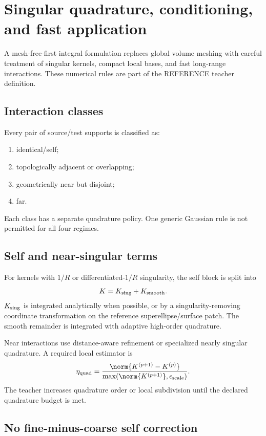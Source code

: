 \section{Singular quadrature, conditioning, and fast application}
\label{sec:em-numerics}

A mesh-free-first integral formulation replaces global volume meshing with
careful treatment of singular kernels, compact local bases, and fast
long-range interactions. These numerical rules are part of the REFERENCE
teacher definition.

\subsection{Interaction classes}

Every pair of source/test supports is classified as:
\begin{enumerate}
\item identical/self;
\item topologically adjacent or overlapping;
\item geometrically near but disjoint;
\item far.
\end{enumerate}
Each class has a separate quadrature policy. One generic Gaussian rule is not
permitted for all four regimes.

\subsection{Self and near-singular terms}

For kernels with $1/R$ or differentiated-$1/R$ singularity, the self block is
split into
\[
  K=K_{\rm sing}+K_{\rm smooth}.
\]
$K_{\rm sing}$ is integrated analytically when possible, or by a
singularity-removing coordinate transformation on the reference
superellipse/surface patch. The smooth remainder is integrated with adaptive
high-order quadrature.

Near interactions use distance-aware refinement or specialized nearly singular
quadrature. A required local estimator is
\[
 \eta_{\rm quad}
 =
 \frac{\norm{K^{(p+1)}-K^{(p)}}}
      {\max(\norm{K^{(p+1)}},\epsilon_{\rm scale})}.
\]
The teacher increases quadrature order or local subdivision until the declared
quadrature budget is met.

\subsection{No fine-minus-coarse self correction}

